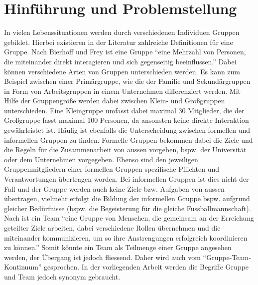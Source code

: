 \chapter{Hinführung und Problemstellung}
\label{kap1_hinfuehrung_problemstellung}


In vielen Lebenssituationen werden durch verschiedenen Individuen Gruppen gebildet. Hierbei existieren in der Literatur zahlreiche Definitionen für eine Gruppe. Nach Bierhoff und Frey ist eine Gruppe “eine Mehrzahl von Personen, die miteinander direkt interagieren und sich gegenseitig beeinflussen.”  \citep[Vgl.][S.~638]{bierhoff_handbuch_2006}
\newline\newline
Dabei können verschiedene Arten von Gruppen unterschieden werden.\citep[Vgl.][S.~11ff.]{thomas_grundris_1991} Es kann zum Beispiel zwischen einer Primärgruppe, wie die der Familie und Sekundärgruppen in Form von Arbeitsgruppen in einem Unternehmen differenziert werden. Mit Hilfe der Gruppengröße werden dabei zwischen Klein- und Großgruppen unterschieden. Eine Kleingruppe umfasst dabei maximal 30 Mitglieder, die der Großgruppe fasst maximal 100 Personen, da ansonsten keine direkte Interaktion gewährleistet ist. 
Häufig ist ebenfalls die Unterscheidung zwischen formellen und informellen Gruppen zu finden. \citep[Vgl.][S.~48]{spies_organisationspsychologie_2010}
Formelle Gruppen bekommen dabei die Ziele und die Regeln für die Zusammenarbeit von aussen vorgeben, bspw. der Universität oder dem Unternehmen vorgegeben. Ebenso sind den jeweiligen Gruppenmitgliedern einer formellen Gruppen spezifische Pflichten und Verantwortungen übertragen worden. Bei informellen Gruppen ist dies nicht der Fall und der Gruppe werden auch keine Ziele bzw. Aufgaben von aussen übertragen, vielmehr erfolgt die Bildung der informellen Gruppe bspw. aufgrund gleicher Bedürfnisse (bspw. die Begeisterung für die gleiche Fussballmannschaft). 
\newline\newline
Nach \citet{dick_teamwork_2013} ist ein Team "`eine Gruppe von Menschen, die gemeinsam an der Erreichung geteilter Ziele arbeiten, dabei verschiedene Rollen übernehmen und die miteinander kommunizieren, um so ihre Anstrengungen erfolgreich koordinieren zu können."' \citep[S.~1]{dick_teamwork_2013} Somit könnte ein Team als Teilmenge einer Gruppe angesehen werden, der Übergang ist jedoch fliessend. Daher wird auch vom "`Gruppe-Team-Kontinuum"' gesprochen.\citep[Vgl.][S.~14]{brettel_erfolgreiche_2009} In der vorliegenden Arbeit werden die Begriffe Gruppe und Team jedoch synonym gebraucht.
